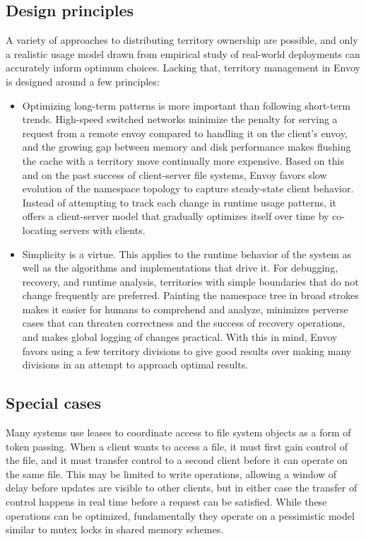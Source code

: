 \subsection{Design principles}

A variety of approaches to distributing territory ownership are possible, and only a realistic usage model drawn from empirical study of real-world deployments can accurately inform optimum choices. Lacking that, territory management in Envoy is designed around a few principles:

\begin{itemize}
\item Optimizing long-term patterns is more important than following short-term trends. High-speed switched networks minimize the penalty for serving a request from a remote envoy compared to handling it on the client's envoy, and the growing gap between memory and disk performance makes flushing the cache with a territory move continually more expensive. Based on this and on the past success of client-server file systems, Envoy favors slow evolution of the namespace topology to capture steady-state client behavior. Instead of attempting to track each change in runtime usage patterns, it offers a client-server model that gradually optimizes itself over time by co-locating servers with clients.

\item Simplicity is a virtue. This applies to the runtime behavior of the system as well as the algorithms and implementations that drive it. For debugging, recovery, and runtime analysis, territories with simple boundaries that do not change frequently are preferred. Painting the namespace tree in broad strokes makes it easier for humans to comprehend and analyze, minimizes perverse cases that can threaten correctness and the success of recovery operations, and makes global logging of changes practical. With this in mind, Envoy favors using a few territory divisions to give good results over making many divisions in an attempt to approach optimal results.
\end{itemize}

\subsection{Special cases}

Many systems use leases to coordinate access to file system objects as a form of token passing. When a client wants to access a file, it must first gain control of the file, and it must transfer control to a second client before it can operate on the same file. This may be limited to write operations, allowing a window of delay before updates are visible to other clients, but in either case the transfer of control happens in real time before a request can be satisfied. While these operations can be optimized, fundamentally they operate on a pessimistic model similar to mutex locks in shared memory schemes.

